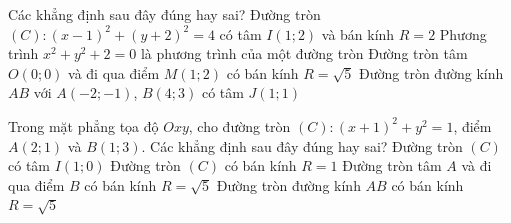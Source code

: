 
\begin{ex}%
	Các khẳng định sau  đây đúng hay sai?
	\choiceTF 
		{Đường tròn $(C)\colon (x-1)^2+(y+2)^2=4$ có tâm $I(1;2)$ và bán kính $R=2$} 
		{Phương trình $x^2+y^2+2=0$ là phương trình của  một đường tròn}
		{\True Đường tròn tâm  $O(0;0)$ và đi qua điểm $M(1;2)$ có bán kính $R=\sqrt{5}$}
		{\True Đường tròn đường kính  $AB$ với $A(-2;-1)$, $B(4;3)$ có tâm $J(1;1)$}
\end{ex}

\begin{ex}%
	Trong mặt phẳng tọa độ $Oxy$, cho đường tròn $(C)\colon (x+1)^2+y^2=1$, điểm $A(2;1)$ và $B(1;3)$. Các  khẳng định sau đây đúng hay sai?
	 \choiceTF
		{Đường tròn $(C)$ có tâm  $I(1;0)$}
		{\True  Đường tròn $(C)$ có bán kính $R=1$}
		{\True Đường tròn tâm $A$ và đi  qua điểm $B$ có bán kính $R=\sqrt{5}$}
		{Đường tròn đường kính $AB$ có bán kính  $R=\sqrt{5}$}
\end{ex}

